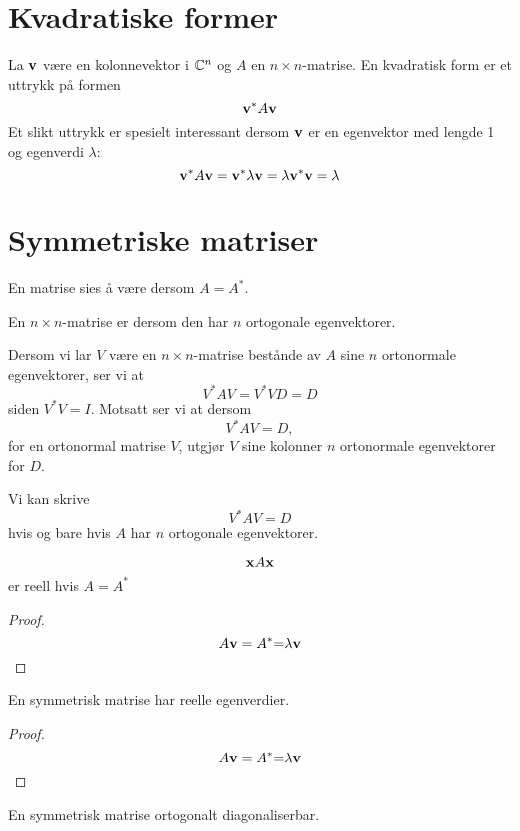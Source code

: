 \section*{Kvadratiske former}
La $\mathbf{v}$ være en kolonnevektor i $\mathbb{C}^n$ og $A$ en $n\times n$-matrise. En kvadratisk form er et uttrykk på formen 
\[
\mathbf{v}^* A \mathbf{v}
\]
Et slikt uttrykk er spesielt interessant dersom $\mathbf{v}$ er en egenvektor med lengde 1 og egenverdi $\lambda$:
\[
\mathbf{v}^* A \mathbf{v}=\mathbf{v}^* \lambda \mathbf{v}=\lambda \mathbf{v}^* \mathbf{v}=\lambda
\]



\section*{Symmetriske matriser}
En matrise sies å være 
 dersom $A=A^*$.

\begin{defnx}
En $n \times n$-matrise er  dersom den har $n$ ortogonale egenvektorer.
\end{defnx}

Dersom vi lar $V$ være en $n \times n$-matrise bestånde av $A$ sine $n$ ortonormale egenvektorer, 
ser vi at 
\[
V^* A V =V^* VD =D
\]
siden $V^* V=I$. Motsatt ser vi at dersom
\[
V^* A V =D,
\]
for en ortonormal matrise $V$, utgjør $V$ sine kolonner  $n$ ortonormale egenvektorer for $D$.

\begin{thm}
Vi kan skrive 
\[
V^*AV=D
\]
hvis og bare hvis $A$ har $n$ ortogonale egenvektorer. 
\end{thm}


\begin{thm}
\[
\mathbf{x} A \mathbf{x}
\]
er reell hvis $A=A^*$
\end{thm}
\begin{proof}
\[
A \mathbf{v}=A^*\mathbf{=} \lambda \mathbf{v}
\]
\end{proof}

\begin{thm}
En  symmetrisk matrise har reelle egenverdier.
\end{thm}
\begin{proof}
\[
A \mathbf{v}=A^*\mathbf{=} \lambda \mathbf{v}
\]
\end{proof}



\begin{thm}
En  symmetrisk matrise ortogonalt diagonaliserbar.
\end{thm}








\kapittelslutt
